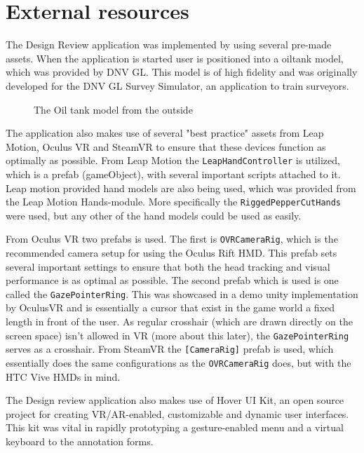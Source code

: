 
\section{External resources}
The Design Review application was implemented by using several pre-made assets.
When the application is started user is positioned into a oiltank model, which was provided by DNV GL. 
This model is of high fidelity and was originally developed for the DNV GL Survey Simulator, an application to train surveyors.

\begin{figure}%
	\caption[The Oil tank model]{The Oil tank model from the outside}
	\label{fig:tank_outside}
\end{figure} 

The application also makes use of several "best practice" assets from Leap Motion, Oculus VR and SteamVR to ensure that these devices function
as optimally as possible. From Leap Motion the \texttt{LeapHandController} is utilized, which is a prefab (gameObject), with several important scripts attached to
it. Leap motion provided hand models are also being used, which was provided from the Leap Motion Hands-module. More specifically 
the \texttt{RiggedPepperCutHands} were used, but any other of the hand models could be used as easily.

From Oculus VR two prefabs is used. The first is \texttt{OVRCameraRig}, which is the recommended camera setup for using the Oculus Rift HMD. This 
prefab sets several important settings to ensure that both the head tracking and visual performance is as optimal as possible. The 
second prefab which is used is one called the \texttt{GazePointerRing}. This was showcased in a demo unity implementation by OculusVR
and is essentially a cursor that exist in the game world a fixed length in front of the user. As regular crosshair (which are drawn directly on the screen space)
isn't allowed in VR (more about this later), the \texttt{GazePointerRing} serves as a crosshair. 
From SteamVR the \texttt{[CameraRig]} prefab is used, which essentially does the same configurations as the \texttt{OVRCameraRig} does, but with the HTC Vive HMDs in mind.

The Design review application also makes use of Hover UI Kit, an open source project for creating VR/AR-enabled, customizable and dynamic user interfaces. 
This kit was vital in rapidly prototyping a gesture-enabled menu and a virtual keyboard to the annotation forms.

